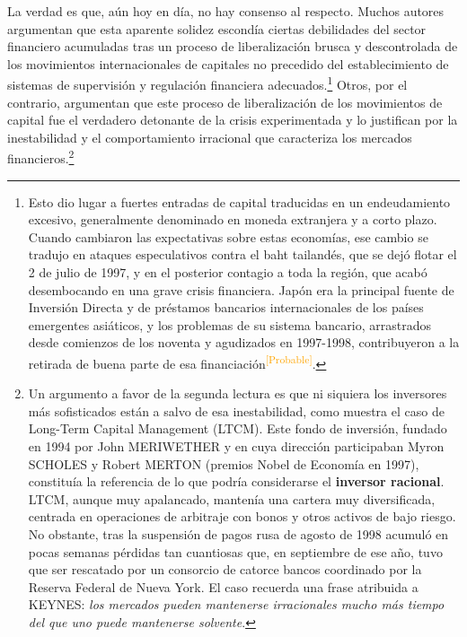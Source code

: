 \documentclass[10pt,a4paper]{article}
\begin{document}
La verdad es que, aún hoy en día, no hay consenso al respecto. Muchos autores argumentan que esta aparente solidez escondía ciertas debilidades del sector financiero acumuladas tras un proceso de liberalización brusca y descontrolada de los movimientos internacionales de capitales no precedido del establecimiento de sistemas de supervisión y regulación financiera adecuados.\footnote{%
    Esto dio lugar a fuertes entradas de capital traducidas en un endeudamiento excesivo, generalmente denominado en moneda extranjera y a corto plazo. Cuando cambiaron las expectativas sobre estas economías, ese cambio se tradujo en ataques especulativos contra el baht tailandés, que se dejó flotar el 2 de julio de 1997, y en el posterior contagio a toda la región, que acabó desembocando en una grave crisis financiera. Japón era la principal fuente de Inversión Directa y de préstamos bancarios internacionales de los países emergentes asiáticos, y los problemas de su sistema bancario, arrastrados desde comienzos de los noventa y agudizados en 1997-1998, contribuyeron a la retirada de buena parte de esa financiación\textcolor{orange}{\textsuperscript{[Probable]}}.
} Otros, por el contrario, argumentan que este proceso de liberalización de los movimientos de capital fue el verdadero detonante de la crisis experimentada y lo justifican por la inestabilidad y el comportamiento irracional que caracteriza los mercados financieros.\footnote{%
    Un argumento a favor de la segunda lectura es que ni siquiera los inversores más sofisticados están a salvo de esa inestabilidad, como muestra el caso de Long-Term Capital Management (LTCM). Este fondo de inversión, fundado en 1994 por John MERIWETHER y en cuya dirección participaban Myron SCHOLES y Robert MERTON (premios Nobel de Economía en 1997), constituía la referencia de lo que podría considerarse el \textbf{inversor racional}. LTCM, aunque muy apalancado, mantenía una cartera muy diversificada, centrada en operaciones de arbitraje con bonos y otros activos de bajo riesgo. No obstante, tras la suspensión de pagos rusa de agosto de 1998 acumuló en pocas semanas pérdidas tan cuantiosas que, en septiembre de ese año, tuvo que ser rescatado por un consorcio de catorce bancos coordinado por la Reserva Federal de Nueva York. El caso recuerda una frase atribuida a KEYNES: \textit{los mercados pueden mantenerse irracionales mucho más tiempo del que uno puede mantenerse solvente}.
}
\end{document}
